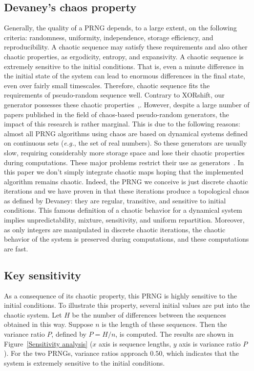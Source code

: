 \documentclass[10pt, a4paper, conference, compsocconf]{IEEEtran}
\begin{document}
\subsection{Devaney's chaos property}
Generally, the quality of a PRNG depends, to a large extent, on the following criteria: randomness, uniformity, independence, storage efficiency, and reproducibility. A chaotic sequence may satisfy these requirements and also other chaotic properties, as ergodicity, entropy, and expansivity. A chaotic sequence is extremely sensitive to the initial conditions. That is, even a minute difference in the initial state of the system can lead to enormous differences in the final state, even over fairly small timescales. Therefore, chaotic sequence fits the requirements of pseudo-random sequence well. Contrary to XORshift, our generator possesses these chaotic properties~\cite{guyeux09},\cite{wang2009}.
However, despite a large number of papers published in the field of chaos-based pseudo-random generators, the impact of this research is rather marginal. This is due to the following reasons: almost all PRNG algorithms using chaos are based on dynamical systems defined on continuous sets (\emph{e.g.}, the set of real numbers). So these generators are usually slow, requiring considerably more storage space and lose their chaotic properties during computations. These major problems restrict their use as generators~\cite{Kocarev2001}.\newline
In this paper we don't simply integrate chaotic maps hoping that the implemented algorithm remains chaotic. Indeed, the PRNG we conceive is just discrete chaotic iterations and we have proven in \cite{guyeux09} that these iterations produce a topological chaos as defined by Devaney: they are regular, transitive, and sensitive to initial conditions. This famous definition of a chaotic behavior for a dynamical system implies unpredictability, mixture, sensitivity, and uniform repartition. Moreover, as only integers are manipulated in discrete chaotic iterations, the chaotic behavior of the system is preserved during computations, and these computations are fast.


\subsection{Key sensitivity}
As a consequence of its chaotic property, this PRNG is highly sensitive to the initial conditions. To illustrate this property, several initial values are put into the chaotic system. Let $H$ be the number 
of differences between the sequences obtained in this way. Suppose $n$ is the length of these 
sequences. Then the variance ratio $P$, defined by $P = H / n$, is computed. The results are 
shown in Figure~\ref{Sensitivity analysis} ($x$ axis is sequence lengths, $y$ axis is variance ratio $P$). For the two PRNGs, variance 
ratios approach $0.50$, which indicates that the system is extremely sensitive to the initial 
conditions.
\end{document}
